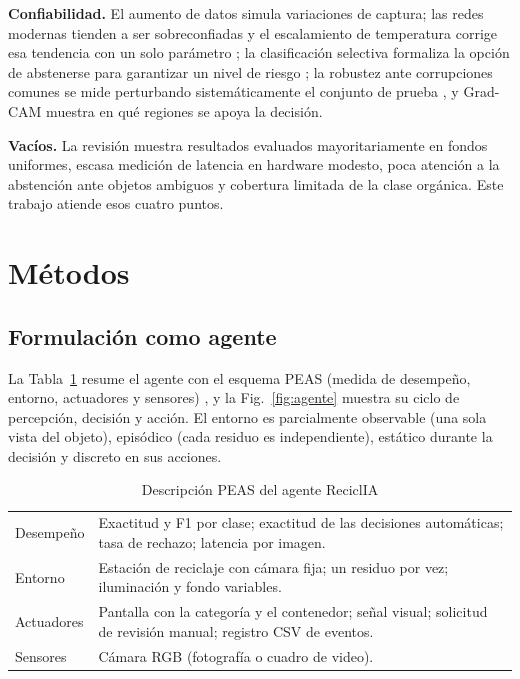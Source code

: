 \documentclass[conference,a4paper]{IEEEtran}
\begin{document}
\textbf{Confiabilidad.} El aumento de datos \cite{shorten2019} simula variaciones de captura; las redes modernas tienden a ser sobreconfiadas y el escalamiento de temperatura corrige esa tendencia con un solo parámetro \cite{guo2017}; la clasificación selectiva formaliza la opción de abstenerse para garantizar un nivel de riesgo \cite{geifman2017}; la robustez ante corrupciones comunes se mide perturbando sistemáticamente el conjunto de prueba \cite{hendrycks2019}, y Grad-CAM \cite{gradcam} muestra en qué regiones se apoya la decisión.

\textbf{Vacíos.} La revisión muestra resultados evaluados mayoritariamente en fondos uniformes, escasa medición de latencia en hardware modesto, poca atención a la abstención ante objetos ambiguos y cobertura limitada de la clase orgánica. Este trabajo atiende esos cuatro puntos.

\section{Métodos}\label{sec:metodos}
\subsection{Formulación como agente}
La Tabla~\ref{tab:peas} resume el agente con el esquema PEAS (medida de desempeño, entorno, actuadores y sensores) \cite{russell2021}, y la Fig.~\ref{fig:agente} muestra su ciclo de percepción, decisión y acción. El entorno es parcialmente observable (una sola vista del objeto), episódico (cada residuo es independiente), estático durante la decisión y discreto en sus acciones.

\begin{table}[t]
\caption{Descripción PEAS del agente ReciclIA}\label{tab:peas}
\centering\footnotesize
\begin{tabular}{@{}p{}p{}@{}}
\toprule
Desempeño & Exactitud y F1 por clase; exactitud de las decisiones automáticas; tasa de rechazo; latencia por imagen. \\
Entorno & Estación de reciclaje con cámara fija; un residuo por vez; iluminación y fondo variables. \\
Actuadores & Pantalla con la categoría y el contenedor; señal visual; solicitud de revisión manual; registro CSV de eventos. \\
Sensores & Cámara RGB (fotografía o cuadro de video). \\
\bottomrule
\end{tabular}
\end{table}
\end{document}
